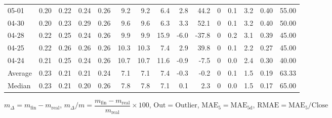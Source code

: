 \begin{threeparttable}
{\begin{tabular}{lrrrrrrrrrrrrrr}
  05-01 &          0.20 &          0.22 &          0.24 &        0.26 &                 9.2 &                9.2 &                 6.4 &        2.8 &         44.2 &              0 &                 0.1 &              3.2 &            0.40 &                  55.00 \\
  04-30 &          0.20 &          0.23 &          0.29 &        0.26 &                 9.6 &                9.6 &                 6.3 &        3.3 &         52.1 &              0 &                 0.1 &              3.2 &            0.40 &                  50.00 \\
  04-28 &          0.22 &          0.25 &          0.24 &        0.26 &                 9.9 &                9.9 &                15.9 &       -6.0 &        -37.8 &              0 &                 0.2 &              3.1 &            0.39 &                  45.00 \\
  04-25 &          0.22 &          0.26 &          0.26 &        0.26 &                10.3 &               10.3 &                 7.4 &        2.9 &         39.8 &              0 &                 0.1 &              2.2 &            0.27 &                  45.00 \\
  04-24 &          0.21 &          0.25 &          0.24 &        0.26 &                10.7 &               10.7 &                11.6 &       -0.9 &         -7.5 &              0 &                 0.0 &              2.4 &            0.30 &                  40.00 \\
Average &          0.23 &          0.21 &          0.21 &        0.24 &                 7.1 &                7.1 &                 7.4 &       -0.3 &         -0.2 &              0 &                 0.1 &              1.5 &            0.19 &                  63.33 \\
 Median &          0.23 &          0.21 &          0.20 &        0.26 &                 7.8 &                7.8 &                 7.1 &        0.1 &          2.3 &              0 &                 0.0 &              1.5 &            0.17 &                  65.00 \\
\bottomrule
\end{tabular}
}
\begin{tablenotes}\footnotesize
\item $m_\Delta=m_{\text{fin}}-m_{\text{real}}$,
$m_\Delta/m=\dfrac{m_{\text{fin}}-m_{\text{real}}}{m_{\text{real}}}\times100$,
$\mathrm{Out}=\text{Outlier}$,
$\mathrm{MAE}_5=\mathrm{MAE}_{5\text{d}}$,
$\mathrm{RMAE}=\mathrm{MAE}_5/\text{Close}$
\end{tablenotes}
\end{threeparttable}
\endgroup

